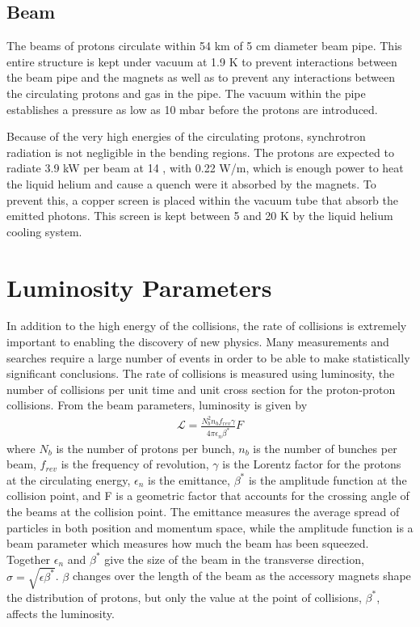 \subsection{Beam}

The beams of protons circulate within 54 km of 5 cm diameter beam pipe.
This entire structure is kept under vacuum at 1.9 K to prevent interactions between the beam pipe and the magnets as well as to prevent any interactions between the circulating protons and gas in the pipe. 
The vacuum within the pipe establishes a pressure as low as 10 mbar before the protons are introduced.

Because of the very high energies of the circulating protons, synchrotron radiation is not negligible in the bending regions.
The protons are expected to radiate 3.9 kW per beam at 14 \TeV, with 0.22 W/m, which is enough power to heat the liquid helium and cause a quench were it absorbed by the magnets.
To prevent this, a copper screen is placed within the vacuum tube that absorb the emitted photons.
This screen is kept between 5 and 20 K by the liquid helium cooling system.


\section{Luminosity Parameters}

In addition to the high energy of the collisions, the rate of collisions is extremely important to enabling the discovery of new physics.
Many measurements and searches require a large number of events in order to be able to make statistically significant conclusions.
The rate of collisions is measured using luminosity, the number of collisions per unit time and unit cross section for the proton-proton collisions.
From the beam parameters, luminosity is given by 
\begin{align}
\mathcal{L} = \frac{N_b^2 n_b f_{rev} \gamma}{4\pi \epsilon_n \beta^*} F \label{eq:luminosity} 
\end{align}
\noindent where $N_b$ is the number of protons per bunch, $n_b$ is the number of bunches per beam, $f_{rev}$ is the frequency of revolution, $\gamma$ is the Lorentz factor for the protons at the circulating energy, $\epsilon_n$ is the emittance, $\beta^*$ is the amplitude function at the collision point, and F is a geometric factor that accounts for the crossing angle of the beams at the collision point. 
The emittance measures the average spread of particles in both position and momentum space, while the amplitude function is a beam parameter which measures how much the beam has been squeezed. 
Together $\epsilon_n$ and $\beta^*$ give the size of the beam in the transverse direction, $\sigma = \sqrt{\epsilon\beta^*}$. 
$\beta$ changes over the length of the beam as the accessory magnets shape the distribution of protons, but only the value at the point of collisions, $\beta^*$, affects the luminosity.

